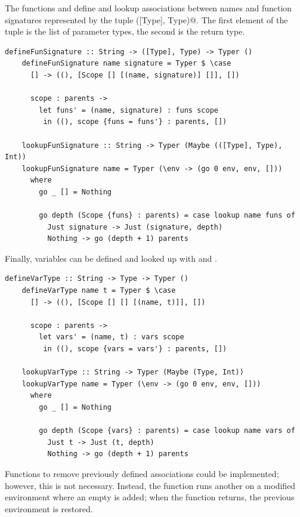 \documentclass[UdineBachThesis,american,11pt]{PhdThesis}
\begin{document}
  The functions \lstinline@defineFunSignature@ and
  \lstinline@lookupFunSignature@ define and lookup associations between names
  and function signatures represented by the tuple \lstinline@([Type], Type)@.
  The first element of the tuple is the list of parameter types, the second is
  the return type.

  \begin{lstlisting}[gobble=4,basicstyle=\ttfamily\small]
    defineFunSignature :: String -> ([Type], Type) -> Typer ()
    defineFunSignature name signature = Typer $ \case
      [] -> ((), [Scope [] [(name, signature)] []], [])

      scope : parents ->
        let funs' = (name, signature) : funs scope
         in ((), scope {funs = funs'} : parents, [])

    lookupFunSignature :: String -> Typer (Maybe (([Type], Type), Int))
    lookupFunSignature name = Typer (\env -> (go 0 env, env, []))
      where
        go _ [] = Nothing

        go depth (Scope {funs} : parents) = case lookup name funs of
          Just signature -> Just (signature, depth)
          Nothing -> go (depth + 1) parents
  \end{lstlisting}

  Finally, variables can be defined and looked up with \lstinline@defineVarType@
  and \lstinline@lookupVarType@.

  \begin{lstlisting}[gobble=4,basicstyle=\ttfamily\small]
    defineVarType :: String -> Type -> Typer ()
    defineVarType name t = Typer $ \case
      [] -> ((), [Scope [] [] [(name, t)]], [])

      scope : parents ->
        let vars' = (name, t) : vars scope
         in ((), scope {vars = vars'} : parents, [])

    lookupVarType :: String -> Typer (Maybe (Type, Int))
    lookupVarType name = Typer (\env -> (go 0 env, env, []))
      where
        go _ [] = Nothing

        go depth (Scope {vars} : parents) = case lookup name vars of
          Just t -> Just (t, depth)
          Nothing -> go (depth + 1) parents
  \end{lstlisting}

  Functions to remove previously defined associations could be implemented;
  however, this is not necessary. Instead, the function \lstinline@withNewScope@
  runs another \lstinline@Typer@ on a modified environment where an empty
  \lstinline@Scope@ is added; when the function returns, the previous
  environment is restored.
\end{document}
